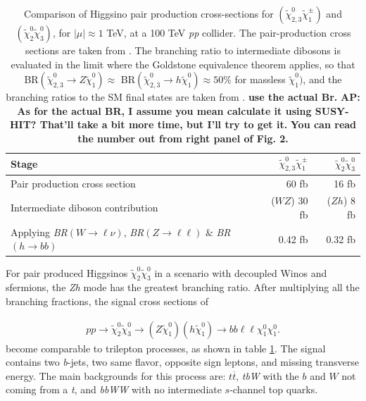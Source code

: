 \documentclass[a4paper,11pt]{article}
\newcommand{\Shufang}[1]{{\bf\color{Maroon}  #1}}
\newcommand{\Adarsh}[1]{{\bf\color{RoyalBlue} AP: #1}}
\newcommand{\N}{\widetilde{\chi}^0}
\begin{document}
\begin{table}
  \centering
  \begin{tabular}{l|rr}
    \toprule
    Stage & $\N_{2,3}\widetilde{\chi}^\pm_{1}$ & $\N_2\N_3$\\
    \midrule
    Pair production cross section & 60 fb & 16 fb\\
    Intermediate diboson contribution & ($WZ$) 30 fb  & ($Zh$) 8 fb \\
    Applying \emph{BR}$(W\rightarrow \ell\nu)$, \emph{BR}$(Z\rightarrow \ell\ell)$ \& \emph{BR}$(h\rightarrow bb)$ & 0.42 fb & 0.32 fb\\
    \bottomrule
  \end{tabular}
  \caption{Comparison of Higgsino pair production cross-sections for
    $(\widetilde{\chi}_{2,3}^0\widetilde{\chi}^\pm_{1})$ and
    $(\N_{2}\N_{3})$, for $|\mu|\approx 1$ TeV, at a 100
    TeV \emph{pp} collider. The pair-production cross sections are taken from
    \citep{Gori:2014oua}. The branching ratio to intermediate dibosons is
    evaluated in the limit where the Goldstone equivalence theorem applies, so
    that BR$(\widetilde{\chi}_{2,3}^0\rightarrow Z \widetilde{ \chi}_{1}^0)\approx$
    BR$(\widetilde{\chi}_{2,3}^0\rightarrow h\widetilde{\chi}_1^0)\approx 50\% $ for massless $\widetilde{\chi}_{1}^0)$, 
    and the branching ratios to the SM final states are taken from
    \citep{Olive:2016xmw}.  
    \Shufang{use the actual Br.} \Adarsh{As for the actual BR, I assume you mean
  calculate it using SUSY-HIT? That'll take a bit more time, but I'll try to
  get it.} \Shufang{You can read the number out from right panel of Fig. 2.} }
  \label{tab:xsections}
\end{table}


For pair produced Higgsinos $\tilde\chi_2^0\tilde\chi_3^0$ in a scenario with
decoupled Winos and  sfermions, the \emph{Zh} mode has the greatest
branching ratio.  After multiplying all the branching fractions, the signal cross
sections of 

\begin{align}
pp\rightarrow \widetilde{\chi}_{2}^{0}\widetilde{\chi}_{3}^{0}\rightarrow
(Z\widetilde{\chi}_1^{0})(h\widetilde{\chi}_1^{0})\rightarrow
bb\ell\ell \chi_1^0\chi_1^0.
\end{align}
become comparable  to trilepton processes, as shown in    table \ref{tab:xsections}.    The signal contains two
\emph{b}-jets, two same flavor, opposite sign leptons, and missing transverse
energy. The main backgrounds for this process are: $t\overline{t}$, \emph{tbW} with
the $b$ and $W$ not coming from a \emph{t}, and \emph{bbWW} with no intermediate
$s$-channel top quarks.  
\end{document}
